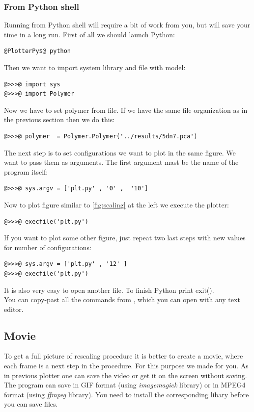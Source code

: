 \documentclass[12pt]{article}
\begin{document}
\begin{mySection}
\subsubsection{From Python shell}
Running from Python shell will require a bit of work from you, but will save your time in a long run.
First of all we should launch Python:
\begin{lstlisting}
@PlotterPy$@ python
\end{lstlisting}
Then we want to import system library and file with model:
\begin{lstlisting}
@>>>@ import sys
@>>>@ import Polymer
\end{lstlisting}
Now we have to set polymer from file. If we have the same file organization as in the previous section then we do this:
 \begin{lstlisting}
@>>>@ polymer  = Polymer.Polymer('../results/5dn7.pca')
\end{lstlisting}
The next step is to set configurations we want to plot in the same figure.  We want to pass them as arguments. The first argument mast be the name of the program itself:
\begin{lstlisting}
@>>>@ sys.argv = ['plt.py' , '0' ,  '10']
\end{lstlisting}
Now to plot figure similar to \ref{fig:scaling} at the left we execute the plotter:
\begin{lstlisting}
@>>>@ execfile('plt.py')
\end{lstlisting}
If you want to plot some other figure, just repeat two last steps with new values for number of configurations:
\begin{lstlisting}
@>>>@ sys.argv = ['plt.py' , '12' ]
@>>>@ execfile('plt.py')
\end{lstlisting}
It is also very easy to open another file. To finish Python print exit().\\
\hint You can copy-past all the commands from , which you can open with any text editor.

\subsection{Movie}
To get a full picture of rescaling procedure it is better to create a movie, where each frame is a next step in the procedure. For this purpose we made  for you. As in previous plotter one can save the video or get it on the screen without saving. The program can save in GIF format (using \textit{imagemagick} library) or in MPEG4 format (using \textit{ffmpeg} library). You need to install the corresponding libary before you can save files.


\end{mySection}
\end{document}
